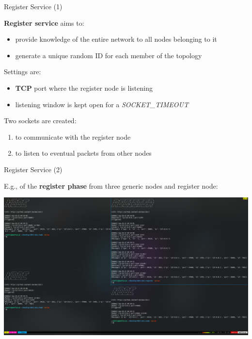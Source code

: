 \documentclass{beamer}
\begin{document}
    	    \begin{frame}{Register Service (1)}
            
            \textbf{Register service} aims to:
            
            \begin{itemize}
                \item provide knowledge of the entire network to all nodes belonging to it
                \item generate a unique random ID for each member of the topology
            \end{itemize}\pause
            
            Settings are:
            \begin{itemize}
                \item \textbf{TCP} port where the register node is listening
                \item listening window is kept open for a \textit{SOCKET\_TIMEOUT}
            \end{itemize}\pause
            
            
            Two sockets are created:
            \begin{enumerate}
                \item to communicate with the register node
                \item to listen to eventual packets from other nodes
            \end{enumerate}
    	    \end{frame}
	        
	        \begin{frame} {Register Service (2)}
	           
	       E.g., of the \textbf{register phase} from three generic nodes and register node:
	        \begin{center}
	         \includegraphics[width=.8\textwidth]{images/register_terminal.png}
	     \end{center}
	        
	        \end{frame}
	        
\end{document}
